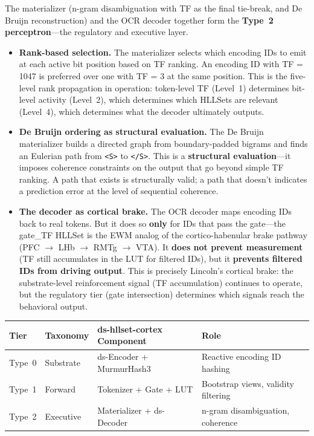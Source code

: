 \documentclass[11pt,a4paper]{article}
\theoremstyle{remark}
\begin{document}
The materializer (n-gram disambiguation with TF as the final tie-break, and
De Bruijn reconstruction) and
the OCR decoder together form the \textbf{Type~2 perceptron}---the regulatory
and executive layer.

\begin{itemize}[leftmargin=*,nosep]
  \item \textbf{Rank-based selection.} The materializer selects which
    encoding IDs to emit at each active bit position based on TF ranking. An
    encoding ID with TF = 1047 is preferred over one with TF = 3 at the same
    position. This is the five-level rank propagation in operation:
    token-level TF (Level~1) determines bit-level activity (Level~2), which
    determines which HLLSets are relevant (Level~4), which determines what the
    decoder ultimately outputs.
  \item \textbf{De Bruijn ordering as structural evaluation.} The De Bruijn
    materializer builds a directed graph from boundary-padded bigrams and finds
    an Eulerian path from \texttt{<S>} to \texttt{</S>}. This is a
    \textbf{structural evaluation}---it imposes coherence constraints on the
    output that go beyond simple TF ranking. A path that exists is structurally
    valid; a path that doesn't indicates a prediction error at the level of
    sequential coherence.
  \item \textbf{The decoder as cortical brake.} The OCR decoder maps encoding
    IDs back to real tokens. But it does so \textbf{only} for IDs that pass
    the gate---the gate\_TF HLLSet is the EWM analog of the cortico-habenular
    brake pathway (PFC $\to$ LHb $\to$ RMTg $\to$ VTA). It \textbf{does not
    prevent measurement} (TF still accumulates in the LUT for filtered IDs),
    but it \textbf{prevents filtered IDs from driving output}. This is
    precisely Lincoln's cortical brake: the substrate-level reinforcement
    signal (TF accumulation) continues to operate, but the regulatory tier
    (gate intersection) determines which signals reach the behavioral output.
\end{itemize}

\begin{center}
\begin{tabular}{@{}llll@{}}
\toprule
\textbf{Tier} & \textbf{Taxonomy} & \textbf{ds-hllset-cortex Component} & \textbf{Role} \\
\midrule
Type~0 & Substrate   & ds-Encoder + MurmurHash3 & Reactive encoding ID hashing \\
Type~1 & Forward     & Tokenizer + Gate + LUT   & Bootstrap views, validity filtering \\
Type~2 & Executive   & Materializer + ds-Decoder& n-gram disambiguation, coherence \\
\bottomrule
\end{tabular}
\end{center}
\end{document}
